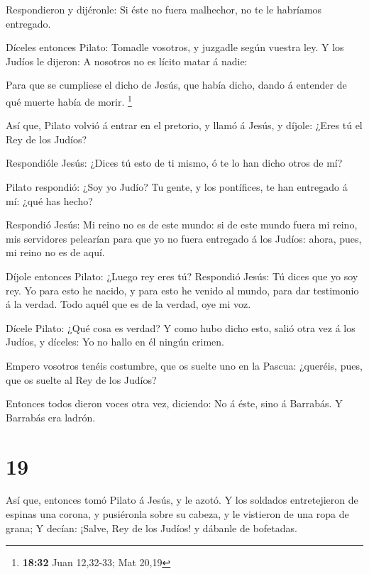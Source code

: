  Respondieron y dijéronle: Si éste no fuera malhechor, no
te le habríamos entregado.

 Díceles entonces Pilato: Tomadle vosotros, y juzgadle
según vuestra ley. Y los Judíos le dijeron: A nosotros no es lícito
matar á nadie:

 Para que se cumpliese el dicho de Jesús, que había
dicho, dando á entender de qué muerte había de morir. \footnote{\textbf{18:32}
  Juan 12,32-33; Mat 20,19}

 Así que, Pilato volvió á entrar en el pretorio, y llamó
á Jesús, y díjole: ¿Eres tú el Rey de los Judíos?

 Respondióle Jesús: ¿Dices tú esto de ti mismo, ó te lo
han dicho otros de mí?

 Pilato respondió: ¿Soy yo Judío? Tu gente, y los
pontífices, te han entregado á mí: ¿qué has hecho?

 Respondió Jesús: Mi reino no es de este mundo: si de
este mundo fuera mi reino, mis servidores pelearían para que yo no fuera
entregado á los Judíos: ahora, pues, mi reino no es de aquí.

 Díjole entonces Pilato: ¿Luego rey eres tú? Respondió
Jesús: Tú dices que yo soy rey. Yo para esto he nacido, y para esto he
venido al mundo, para dar testimonio á la verdad. Todo aquél que es de
la verdad, oye mi voz.

 Dícele Pilato: ¿Qué cosa es verdad? Y como hubo dicho
esto, salió otra vez á los Judíos, y díceles: Yo no hallo en él ningún
crimen.

 Empero vosotros tenéis costumbre, que os suelte uno en
la Pascua: ¿queréis, pues, que os suelte al Rey de los Judíos?

 Entonces todos dieron voces otra vez, diciendo: No á
éste, sino á Barrabás. Y Barrabás era ladrón.

\hypertarget{section-18}{%
\section{19}\label{section-18}}

 Así que, entonces tomó Pilato á Jesús, y le azotó.
 Y los soldados entretejieron de espinas una corona, y
pusiéronla sobre su cabeza, y le vistieron de una ropa de grana;
 Y decían: ¡Salve, Rey de los Judíos! y dábanle de
bofetadas.

